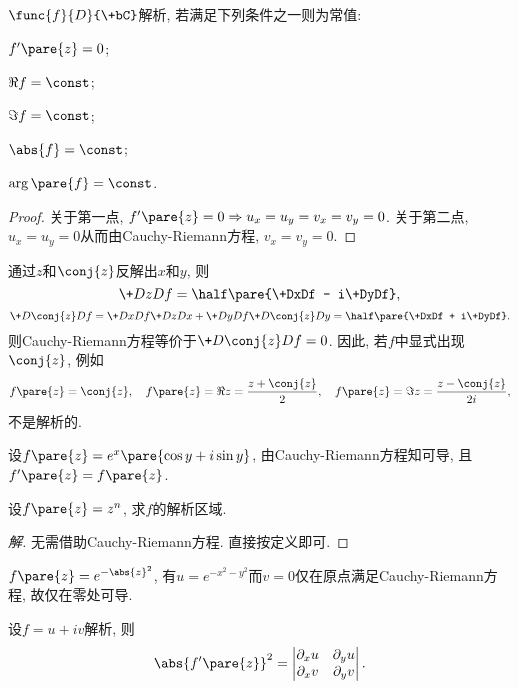 \documentclass[../ComplexVariable.tex]{subfiles}
\begin{document}
\begin{sample}
    \begin{ex}
        $\func{f}{D}{\+bC}$解析, 若满足下列条件之一则为常值:
        \begin{cenum}
            \item $f'\pare{z} = 0$;
            \item $\Re f = \const$;
            \item $\Im f = \const$;
            \item $\abs{f} = \const$;
            \item $\arg\pare{f} = \const$.
        \end{cenum}
    \end{ex}
    \begin{proof}
        关于第一点, $f'\pare{z} = 0\Rightarrow u_x=u_y=v_x=v_y = 0$. 关于第二点, $u_x=u_y=0$从而由Cauchy-Riemann方程, $v_x=v_y=0$. 
    \end{proof}
\end{sample}
\begin{remark}
    通过$z$和$\conj{z}$反解出$x$和$y$, 则
    \[ \+DzDf = \half\pare{\+DxDf - i\+DyDf}, \]
    \[ \+D{\conj{z}}Df = \+DxDf\+DzDx + \+DyDf \+D{\conj{z}}Dy = \half\pare{\+DxDf + i\+DyDf}. \]
    则Cauchy-Riemann方程等价于$\displaystyle\+D{\conj{z}}Df = 0$. 因此, 若$f$中显式出现$\conj{z}$, 例如
    \[ f\pare{z} = \conj{z},\quad f\pare{z} = \Re z = \frac{z+\conj{z}}{2}, \quad f\pare{z} = \Im z = \frac{z - \conj{z}}{2i}, \]
    不是解析的.
\end{remark}
\begin{sample}
    \begin{ex}
        设$f\pare{z} = e^x\pare{\cos y + i\sin y}$, 由Cauchy-Riemann方程知可导, 且$f'\pare{z} = f\pare{z}$.
    \end{ex}
    \begin{ex}
        设$f\pare{z} = z^n$, 求$f$的解析区域.
    \end{ex}
    \begin{proof}[解]
        无需借助Cauchy-Riemann方程. 直接按定义即可.
    \end{proof}
    \begin{ex}
        $f\pare{z} = e^{-\abs{z}^2}$, 有$u = e^{-x^2-y^2}$而$v=0$仅在原点满足Cauchy-Riemann方程, 故仅在零处可导.
    \end{ex}
    \begin{ex}
        设$f = u+iv$解析, 则
        \[ \abs{f'\pare{z}}^2 = \begin{vmatrix}
            \partial_x u & \partial_y u \\
            \partial_x v & \partial_y v
        \end{vmatrix}. \]
    \end{ex}
\end{sample}
\end{document}
